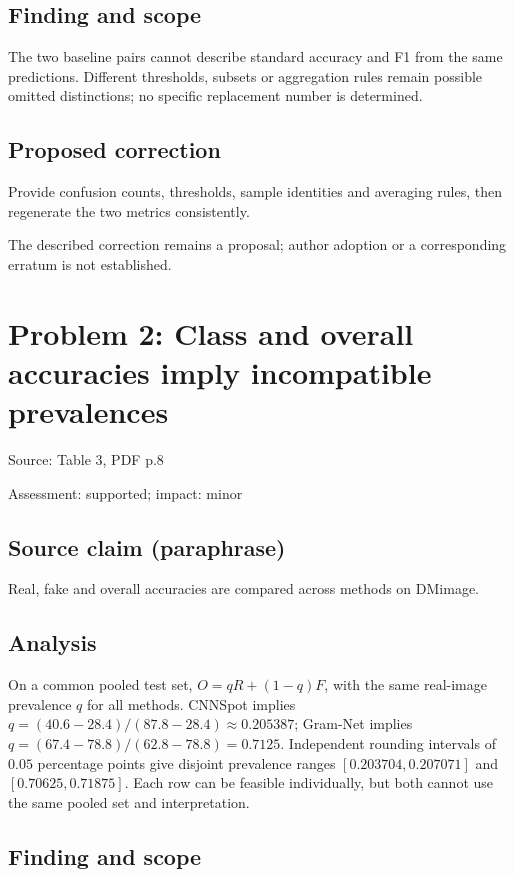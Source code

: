 \documentclass[11pt]{article}
\begin{document}
\subsection*{Finding and scope}

The two baseline pairs cannot describe standard accuracy and F1 from the same predictions. Different thresholds, subsets or aggregation rules remain possible omitted distinctions; no specific replacement number is determined.

\subsection*{Proposed correction}

Provide confusion counts, thresholds, sample identities and averaging rules, then regenerate the two metrics consistently.

The described correction remains a proposal; author adoption or a corresponding erratum is not established.

\section*{Problem 2: Class and overall accuracies imply incompatible prevalences}

Source: Table 3, PDF p.8

Assessment: supported; impact: minor

\subsection*{Source claim (paraphrase)}

Real, fake and overall accuracies are compared across methods on DMimage.

\subsection*{Analysis}

On a common pooled test set, \(O=qR+(1-q)F\), with the same real-image prevalence \(q\) for all methods. CNNSpot implies \(q=(40.6-28.4)/(87.8-28.4)\approx0.205387\); Gram-Net implies \(q=(67.4-78.8)/(62.8-78.8)=0.7125\). Independent rounding intervals of \(0.05\) percentage points give disjoint prevalence ranges \([0.203704,0.207071]\) and \([0.70625,0.71875]\). Each row can be feasible individually, but both cannot use the same pooled set and interpretation.

\subsection*{Finding and scope}
\end{document}
